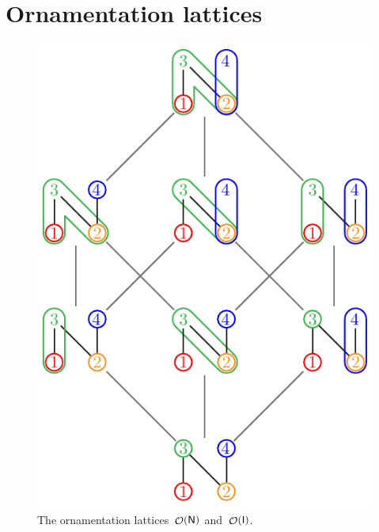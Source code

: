 \documentclass{amsart}
\theoremstyle{definition}
\renewcommand{\c}[1]{\mathcal{#1}} %
\DeclareMathOperator{\Orn}{\c{O}}  %
\newcommand{\Igraph}{\sf I} %
\newcommand{\Ngraph}{\sf N} %
\begin{document}

\newpage
\section{Ornamentation lattices}
\label{sec:ornamentations}

\begin{figure}
	\centerline{\includegraphics[scale=.8]{ornamentationsN} \qquad {}}
	\caption{The ornamentation lattices~$\Orn(\Ngraph)$ and~$\Orn(\Igraph)$.}
	\label{fig:ornamentationsNI}
\end{figure}
\end{document}
